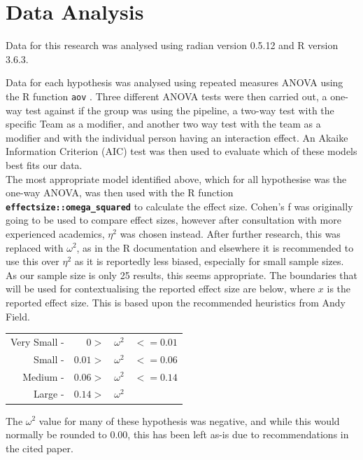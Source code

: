 \documentclass[journal]{IEEEtran}
\begin{document}
\lstset{language = R}
\section{Data Analysis}
    Data for this research was analysed using radian version 0.5.12 and R version 3.6.3.

    Data for each hypothesis was analysed using repeated measures ANOVA \cite{carvadiaANOVA} using the R function \lstinline{aov} \cite{RaovDocs}. Three different ANOVA tests were then carried out, a one-way test against if the group was using the pipeline, a two-way test with the specific Team as a modifier, and another two way test with the team as a modifier and with the individual person having an interaction effect. An Akaike Information Criterion (AIC) \cite{AIC} test was then used to evaluate which of these models best fits our data. \\
    \todo{}
    The most appropriate model identified above, which for all hypothesise was the one-way ANOVA, was then used with the R function \textbf{\lstinline{effectsize::omega_squared}}\cite{RcohensfDocs} to calculate the effect size. Cohen's f was originally going to be used to compare effect sizes, however after consultation with more experienced academics, $\eta^2$ was chosen instead. After further research, this was replaced with $\omega^2$, as in the R documentation and elsewhere \cite{RcohensfDocs, statHowToOmegaSquared,ALBERS2018187} it is recommended to use this over $\eta^2$ as it is reportedly less biased, especially for small sample sizes\cite{ALBERS2018187}. As our sample size is only 25 results, this seems appropriate. The boundaries that will be used for contextualising the reported effect size are below, where $x$ is the reported effect size. This is based upon the recommended heuristics from Andy Field\cite{field2013discovering}.

    \begin{tabularx}{\linewidth}{r r c l}
        Very Small - & $0 > $ & $ \omega^2 $ & $<=0.01$ \\
        Small - & $0.01 > $ & $ \omega^2 $ & $<=0.06$ \\
        Medium - & $0.06 > $ & $ \omega^2 $ & $<=0.14$ \\
        Large - & $0.14 > $ & $ \omega^2 $ &  
    \end{tabularx}

    The $\omega^2$ value for many of these hypothesis was negative, and while this would normally be rounded to 0.00, this has been left as-is due to recommendations in the cited paper\cite{okada2017negative}.
\end{document}
